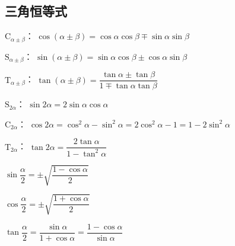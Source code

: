   \subsection{三角恒等式}
    \begin{description}[leftmargin=0pt,labelsep=0pt]
      \item%
        \begin{itemizeMy}
          \item $\mathrm{C}_{\alpha\pm\beta}$：
          $\cos(\alpha\pm\beta)=\cos\alpha\cos\beta \mp \sin\alpha\sin\beta$
          \item $\mathrm{S}_{\alpha\pm\beta}$：
          $\sin(\alpha\pm\beta)=\sin\alpha\cos\beta \pm \cos\alpha\sin\beta$
          \item $\mathrm{T}_{\alpha\pm\beta}$：
          $\tan(\alpha\pm\beta)=\dfrac{\tan\alpha\pm \tan\beta}{1\mp\tan\alpha\tan\beta}$
        \end{itemizeMy}
      \item%
        \begin{itemizeMy}
          \item $\mathrm{S}_{2\alpha}$：
          $\sin{2\alpha}=2\sin\alpha\cos\alpha$
          \item $\mathrm{C}_{2\alpha}$：
          $\cos{2\alpha}=\cos^2{\alpha}-\sin^2{\alpha}=2\cos^2\alpha-1=1-2\sin^2\alpha$
          \item $\mathrm{T}_{2\alpha}$：
          $\tan{2\alpha}=\dfrac{2\tan\alpha}{1-\tan^2\alpha}$
        \end{itemizeMy}
        \item%
          \begin{itemizeMy}
            \item
            $\sin{\dfrac{\alpha}2}=\pm\sqrt{\dfrac{1-\cos\alpha}2}$
            \item $\cos{\dfrac{\alpha}2}=\pm\sqrt{\dfrac{1+\cos\alpha}2}$
            \item $\tan{\dfrac{\alpha}2}=\dfrac{\sin\alpha}{1+\cos\alpha}=\dfrac{1-\cos\alpha}{\sin\alpha}$
          \end{itemizeMy}

\end{description}
